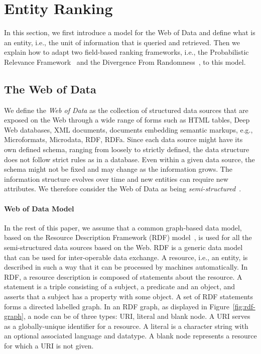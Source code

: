 \section{Entity Ranking}
\label{sec:ranking}

In this section, we first introduce a model for the Web of Data and define what is an entity, i.e., the unit of information that is queried and retrieved. Then we explain how to adapt two field-based ranking frameworks, i.e., the Probabilistic Relevance Framework~\cite{Robertson:2009:PRF} and the Divergence From Randomness~\cite{amati:2002:acm}, to this model.

\subsection{The Web of Data}
\label{sec:wod}

We define the \emph{Web of Data} as the collection of structured data sources that are exposed on the Web through a wide range of forms such as HTML tables, Deep Web databases, XML documents, documents embedding semantic markups, e.g., Microformats, Microdata, RDF, RDFa. Since each data source might have its own defined schema, ranging from loosely to strictly defined, the data structure does not follow strict rules as in a database. Even within a given data source, the schema might not be fixed and may change as the information grows. The information structure evolves over time and new entities can require new attributes. We therefore consider the Web of Data as being \emph{semi-structured}~\cite{abiteboul:1997:icdt}.

\paragraph{Web of Data Model} In the rest of this paper, we assume that a common graph-based data model, based on the Resource Description Framework (RDF) model~\cite{klyne_carroll:2004}, is used for all the semi-structured data sources based on the Web. RDF is a generic data model that can be used for inter-operable data exchange. A resource, i.e., an entity, is described in such a way that it can be processed by machines automatically. In RDF, a resource description is composed of statements about the resource. A statement is a triple consisting of a subject, a predicate and an object, and asserts that a subject has a property with some object. A set of RDF statements forms a directed labelled graph. In an RDF graph, as displayed in Figure~\ref{fig:rdf-graph}, a node can be of three types: URI, literal and blank node. A URI serves as a globally-unique identifier for a resource. A literal is a character string with an optional associated language and datatype. A blank node represents a resource for which a URI is not given.

